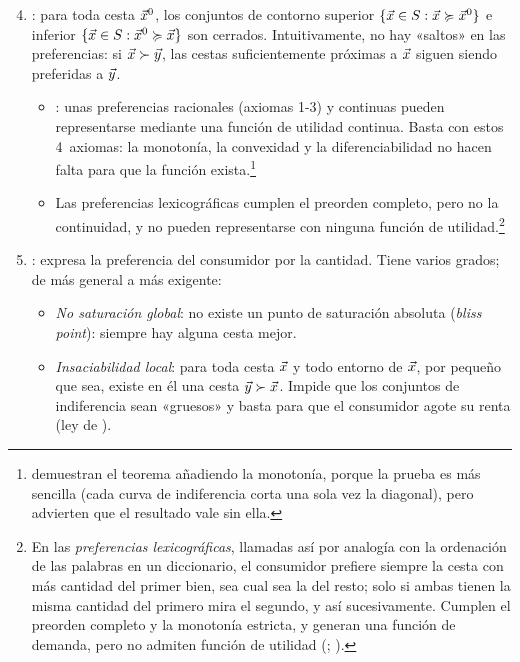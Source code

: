 \documentclass[11pt]{article}
\begin{document}
\begin{enumerate}
\setcounter{enumi}{3}
\item {}: para toda cesta $\vec{x}^0$, los conjuntos de contorno superior $\{\vec{x}\in S: \vec{x}\succcurlyeq \vec{x}^0\}$ e inferior $\{\vec{x}\in S: \vec{x}^0\succcurlyeq \vec{x}\}$ son cerrados. Intuitivamente, no hay «saltos» en las preferencias: si $\vec{x}\succ \vec{y}$, las cestas suficientemente próximas a $\vec{x}$ siguen siendo preferidas a $\vec{y}$.
  \begin{itemize}
  \item {}: unas preferencias racionales (axiomas 1-3) y continuas pueden representarse mediante una función de utilidad continua\nocite{Debreu1959Theory}. Basta con estos 4~axiomas: la monotonía, la convexidad y la diferenciabilidad no hacen falta para que la función exista.\footnote{\textcite[prop.~3.C.1]{MasColellWhinstonGreen1995} demuestran el teorema añadiendo la monotonía, porque la prueba es más sencilla (cada curva de indiferencia corta una sola vez la diagonal), pero advierten que el resultado vale sin ella.}
  \item Las preferencias lexicográficas cumplen el preorden completo, pero no la continuidad, y no pueden representarse con ninguna función de utilidad.\footnote{En las \emph{preferencias lexicográficas}, llamadas así por analogía con la ordenación de las palabras en un diccionario, el consumidor prefiere siempre la cesta con más cantidad del primer bien, sea cual sea la del resto; solo si ambas tienen la misma cantidad del primero mira el segundo, y así sucesivamente. Cumplen el preorden completo y la monotonía estricta, y generan una función de demanda, pero no admiten función de utilidad (\textcite[ejemplo~3.C.1]{MasColellWhinstonGreen1995}; \textcite{OsborneRubinstein2020Models}).}
  \end{itemize}
\item {}: expresa la preferencia del consumidor por la cantidad. Tiene varios grados; de más general a más exigente:
  \begin{itemize}
  \item \emph{No saturación global}: no existe un punto de saturación absoluta (\emph{bliss point}): siempre hay alguna cesta mejor.
  \item \emph{Insaciabilidad local}: para toda cesta $\vec{x}$ y todo entorno de $\vec{x}$, por pequeño que sea, existe en él una cesta $\vec{y}\succ \vec{x}$. Impide que los conjuntos de indiferencia sean «gruesos» y basta para que el consumidor agote su renta (ley de ).

\end{itemize}
\end{enumerate}
\end{document}

